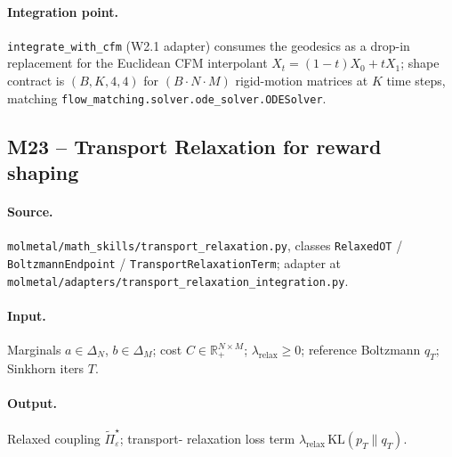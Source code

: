 \paragraph{Integration point.}
\texttt{integrate\_with\_cfm} (W2.1 adapter) consumes the
geodesics as a drop-in replacement for the Euclidean CFM
interpolant $X_{t} = (1 - t) X_{0} + t X_{1}$; shape contract is
$(B, K, 4, 4)$ for $(B \cdot N \cdot M)$ rigid-motion matrices at
$K$ time steps, matching
\texttt{flow\_matching.solver.ode\_solver.ODESolver}.

\subsection*{M23 -- Transport Relaxation for reward shaping}
\label{supp:s2-m23}

\paragraph{Source.}
\texttt{molmetal/math\_skills/transport\_relaxation.py}, classes
\texttt{RelaxedOT} / \texttt{BoltzmannEndpoint} /
\texttt{TransportRelaxationTerm}; adapter at
\texttt{molmetal/adapters/transport\_relaxation\_integration.py}.

\paragraph{Input.}
Marginals $a \in \Delta_{N}$, $b \in \Delta_{M}$; cost
$C \in \mathbb{R}^{N \times M}_{+}$; $\lambda_{\mathrm{relax}} \ge 0$;
reference Boltzmann $q_{T}$; Sinkhorn iters $T$.

\paragraph{Output.}
Relaxed coupling $\tilde{\Pi}^{\star}_{\varepsilon}$; transport-
relaxation loss term
$\lambda_{\mathrm{relax}}\, \mathrm{KL}(p_{T} \| q_{T})$.

